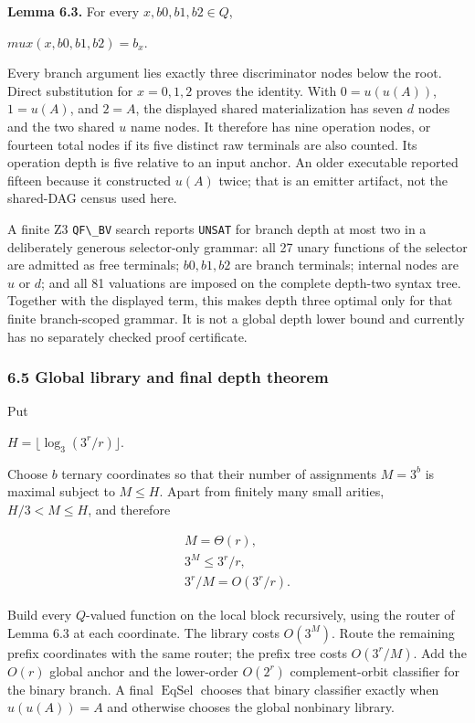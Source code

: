\documentclass[
  11pt,
]{article}
\newcommand{\passthrough}[1]{#1}
\theoremstyle{definition}
\theoremstyle{remark}
\begin{document}
\textbf{Lemma 6.3.} For every \(x,b0,b1,b2 \in Q\),

\(mux(x,b0,b1,b2)=b_x\).

Every branch argument lies exactly three discriminator nodes below the
root. Direct substitution for \(x=0,1,2\) proves the identity. With
\(0=u(u(A))\), \(1=u(A)\), and \(2=A\), the displayed shared
materialization has seven \(d\) nodes and the two shared \(u\) name
nodes. It therefore has nine operation nodes, or fourteen total nodes if
its five distinct raw terminals are also counted. Its operation depth is
five relative to an input anchor. An older executable reported fifteen
because it constructed \(u(A)\) twice; that is an emitter artifact, not
the shared-DAG census used here.

A finite Z3 \passthrough{\lstinline!QF\_BV!} search reports
\passthrough{\lstinline!UNSAT!} for branch depth at most two in a
deliberately generous selector-only grammar: all 27 unary functions of
the selector are admitted as free terminals; \(b0,b1,b2\) are branch
terminals; internal nodes are \(u\) or \(d\); and all 81 valuations are
imposed on the complete depth-two syntax tree. Together with the
displayed term, this makes depth three optimal only for that finite
branch-scoped grammar. It is not a global depth lower bound and
currently has no separately checked proof certificate.

\hypertarget{global-library-and-final-depth-theorem}{%
\subsubsection{6.5 Global library and final depth
theorem}\label{global-library-and-final-depth-theorem}}

Put

\(H=\lfloor \log_3(3^r/r) \rfloor\).

Choose \(b\) ternary coordinates so that their number of assignments
\(M=3^b\) is maximal subject to \(M\le H\). Apart from finitely many
small arities, \(H/3<M\le H\), and therefore

\[
\begin{aligned}
M=\Theta(r), \\
3^M\le 3^r/r, \\
3^r/M=O(3^r/r).
\end{aligned}
\]

Build every \(Q\)-valued function on the local block recursively, using
the router of Lemma 6.3 at each coordinate. The library costs
\(O(3^M)\). Route the remaining prefix coordinates with the same router;
the prefix tree costs \(O(3^r/M)\). Add the \(O(r)\) global anchor and
the lower-order \(O(2^r)\) complement-orbit classifier for the binary
branch. A final \(\operatorname{EqSel}\) chooses that binary classifier
exactly when \(u(u(A))=A\) and otherwise chooses the global nonbinary
library.
\end{document}
